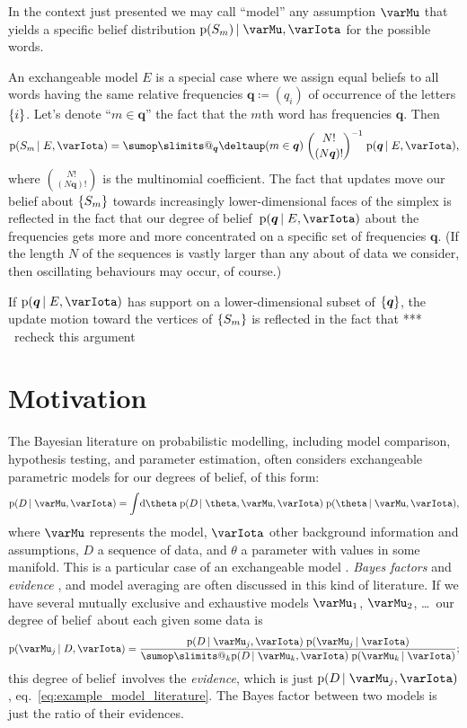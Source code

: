\documentclass[\ifafour a4paper,12pt,\else a5paper,10pt,\fi%
onecolumn,oneside,article,%
british%
]{memoir}
\makeatletter
\theoremstyle{remark}
\theoremstyle{innote}
\def\sum{\DOTSI\sumop\slimits@}
\newcommand*{\citep}{\parencites}
\newcommand*{\delt}{\deltaup}%
\newcommand*{\di}{\mathrm{d}}%
\newcommand*{\defd}{\coloneqq}
\DeclarePairedDelimiter\set{\{}{\}}
\newcommand*{\pf}{\mathrm{p}}%
\renewcommand*{\|}{\nonscript\,\vert\nonscript\;\mathopen{}}
\newcommand*{\chap}{ch.}%
\newcommand*{\eqn}{eq.}%
\newcommand*{\puzzle}{\maltese}
\newcommand{\mynote}[1]{ {\color{notecolour}\puzzle\ #1}}
\newcommand*{\dob}{degree of belief}
\newcommand*{\dobs}{degrees of belief}
\newcommand*{\yM}{\varMu}
\newcommand*{\yI}{\varIota}
\newcommand*{\yD}{D}
\newcommand*{\yHm}{\yM}
\newcommand*{\yE}{E}
\newcommand*{\yq}{\bm{q}}
\makeatother
\begin{document}
In the context just presented we may call \enquote{model} any assumption
$\yM$ that yields a specific belief distribution $\pf(S_m) \|\yM, \yI$ for
the possible words.

An exchangeable model $\yE$ is a special case where we assign equal beliefs
to all words having the same relative frequencies $\yq \defd (q_i)$ of
occurrence of the letters $\set{i}$. Let's denote \enquote{$m \in \yq$} the
fact that the $m$th word has frequencies $\yq$. Then
\begin{equation}
  \label{eq:freq_words_exchang}
  \pf(S_m \| \yE, \yI) =
  \sum_{\yq}\delt(m \in \yq)\; \binom{N!}{(N\yq)!}^{-1}\; \pf(\yq \| \yE, \yI),
\end{equation}
where $\binom{N!}{(N\yq)!}$ is the multinomial coefficient. The fact that
updates move our belief about $\set{S_m}$ towards increasingly
lower-dimensional faces of the simplex is reflected in the fact that our
\dob\ $\pf(\yq \| \yE, \yI)$ about the frequencies gets more and more
concentrated on a specific set of frequencies $\yq$. (If the length $N$ of
the sequences is vastly larger than any about of data we consider, then
oscillating behaviours may occur, of course.)

If $\pf(\yq \| \yE, \yI)$ has support on a lower-dimensional subset of
$\set{\yq}$, the update motion toward the vertices of $\set{S_m}$ is
reflected in the fact that ***\mynote{recheck this argument}

\section{Motivation}
\label{sec:motivation}

The Bayesian literature on probabilistic modelling, including model
comparison, hypothesis testing, and parameter estimation, often considers
exchangeable parametric models for our \dobs, of this form:
\begin{equation}
  \label{eq:example_model_literature}
  \pf(\yD \| \yHm, \yI) =
  \int\!\di\theta\; \pf(\yD \| \theta,\yHm,\yI)\;
  \pf(\theta \| \yHm, \yI),
\end{equation}
where $\yHm$ represents the model, $\yI$ other background information and
assumptions, $\yD$ a sequence of data, and $\theta$ a parameter with values
in some manifold. This is a particular case of an exchangeable model
\citep[\chap~4]{bernardoetal1994_r2000}. \emph{Bayes factors} and
\emph{evidence} \citep{good1985,mackay1992,kass1993,kassetal1995}, and
model averaging
\citep{draper1993_r2005,chatfield1995,draper1995,hoetingetal1999} are often
discussed in this kind of literature. If we have several mutually exclusive
and exhaustive models $\yHm_1$, $\yHm_2$, \dots\ our \dob\ about each given
some data is
\begin{equation}
  \label{eq:plaus_model}
  \pf(\yHm_j \| \yD, \yI) =
  \frac{
  \pf(\yD \| \yHm_j, \yI)\; \pf(\yHm_j \| \yI)
  }{
  \sum_k \pf(\yD \| \yHm_k, \yI)\; \pf(\yHm_k \| \yI)
  };
\end{equation}
this \dob\ involves the \emph{evidence}, which is just
$\pf(\yD \| \yHm_j, \yI)$, \eqn~\eqref{eq:example_model_literature}. The
Bayes factor between two models is just the ratio of their evidences.
\end{document}
